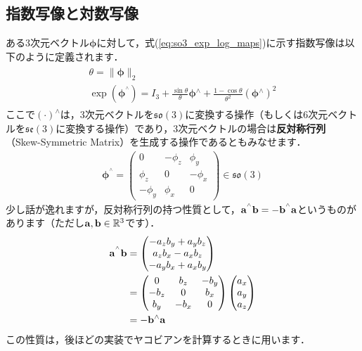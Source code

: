\subsection{指数写像と対数写像}

ある3次元ベクトル$\boldsymbol \phi$に対して，式(\ref{eq:so3_exp_log_maps})に示す指数写像は以下のように定義されます．
%
\begin{align}
  \begin{gathered}
    \theta = \| \boldsymbol \phi \|_{2} \\
    \exp \left( \boldsymbol \phi^{^\wedge} \right)
    =
    I_{3} +
    \frac{ \sin \theta }{ \theta } \boldsymbol \phi{^\wedge} +
    \frac{ 1 - \cos \theta }{ \theta^{2} } \left( \boldsymbol \phi{^\wedge} \right)^{2}
  \end{gathered}
  \label{eq:so3_exp_map}
\end{align}
%
ここで$\left( \cdot \right)^{\wedge}$は，3次元ベクトルを$\mathfrak{so}(3)$に変換する操作（もしくは6次元ベクトルを$\mathfrak{se}(3)$に変換する操作）であり，3次元ベクトルの場合は{\bf 反対称行列}（Skew-Symmetric Matrix）を生成する操作であるともみなせます．
%
\begin{align}
  \boldsymbol \phi^{^\wedge}
%
  = \left( \begin{matrix}
      0         & -\phi_{z} & \phi_{y} \\
      \phi_{z}  & 0         & -\phi_{x} \\
      -\phi_{y} & \phi_{x}  & 0
    \end{matrix} \right) \in \mathfrak{so}(3)
  \label{eq:skew_symmetric_matrix}
\end{align}
%
少し話が逸れますが，反対称行列の持つ性質として，${\bf a}^{^\wedge} {\bf b} = -{\bf b}^{^\wedge} {\bf a}$というものがあります（ただし${\bf a}, {\bf b} \in \mathbb{R}^{3}$です）．
%
\begin{align}
  \begin{split}
    {\bf a}^{^\wedge} {\bf b}
%
    & = \left( \begin{matrix}
          -a_{z} b_{y} + a_{y} b_{z} \\
           a_{z} b_{x} - a_{x} b_{z} \\
          -a_{y} b_{x} + a_{x} b_{y}
        \end{matrix} \right) \\
%
    & = \left( \begin{matrix}
          0      &  b_{z} & -b_{y} \\
          -b_{z} & 0      & b_{x} \\
          b_{y}  & -b_{x} & 0
        \end{matrix} \right)
        \left( \begin{matrix}
          a_{x} \\
          a_{y} \\
          a_{z}
        \end{matrix} \right) \\
%
     & = -{\bf b}^{\wedge} {\bf a} 
  \end{split}
\end{align}
%
この性質は，後ほどの実装でヤコビアンを計算するときに用います．

